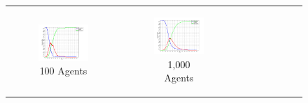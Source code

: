 \begin{figure}
\begin{center}
	\begin{tabular}{c c c}
		\begin{subfigure}[b]{0.3\textwidth}
			\centering
			\includegraphics[width=1\textwidth, angle=0]{./../shared/fig/frabs/SIR_100agents_150t_01dt_parallel.png}
			\caption{100 Agents}
			\label{fig:sir_abs_approximating_100}
		\end{subfigure}
    	&
		\begin{subfigure}[b]{0.3\textwidth}
			\centering
			\includegraphics[width=1\textwidth, angle=0]{./../shared/fig/frabs/SIR_1000agents_150t_01dt_parallel.png}
			\caption{1,000 Agents}
			\label{fig:sir_abs_approximating_1000}
		\end{subfigure}
    	&
		\begin{subfigure}[b]{0.3\textwidth}

\end{subfigure}
\end{tabular}
\end{center}
\end{figure}

